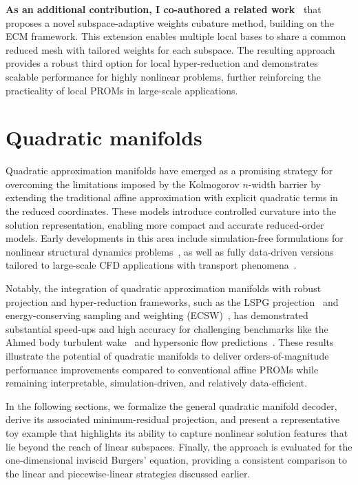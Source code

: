 \textbf{As an additional contribution, I co-authored a related work~\cite{bravo2024subspace}} that proposes a novel subspace-adaptive weights cubature method, building on the ECM framework. This extension enables multiple local bases to share a common reduced mesh with tailored weights for each subspace. The resulting approach provides a robust third option for local hyper-reduction and demonstrates scalable performance for highly nonlinear problems, further reinforcing the practicality of local PROMs in large-scale applications.


\section{Quadratic manifolds}

Quadratic approximation manifolds have emerged as a promising strategy for overcoming the limitations imposed by the Kolmogorov $n$-width barrier by extending the traditional affine approximation with explicit quadratic terms in the reduced coordinates. These models introduce controlled curvature into the solution representation, enabling more compact and accurate reduced-order models. Early developments in this area include simulation-free formulations for nonlinear structural dynamics problems~\cite{jain2017quadratic}, as well as fully data-driven versions tailored to large-scale CFD applications with transport phenomena~\cite{barnett2022quadratic}. 

Notably, the integration of quadratic approximation manifolds with robust projection and hyper-reduction frameworks, such as the LSPG projection~\cite{carlberg2011efficient} and energy-conserving sampling and weighting (ECSW)~\cite{grimberg2021mesh}, has demonstrated substantial speed-ups and high accuracy for challenging benchmarks like the Ahmed body turbulent wake~\cite{barnett2022quadratic} and hypersonic flow predictions~\cite{chmiel2025unified}. These results illustrate the potential of quadratic manifolds to deliver orders-of-magnitude performance improvements compared to conventional affine PROMs while remaining interpretable, simulation-driven, and relatively data-efficient.

In the following sections, we formalize the general quadratic manifold decoder, derive its associated minimum-residual projection, and present a representative toy example that highlights its ability to capture nonlinear solution features that lie beyond the reach of linear subspaces. Finally, the approach is evaluated for the one-dimensional inviscid Burgers’ equation, providing a consistent comparison to the linear and piecewise-linear strategies discussed earlier.

